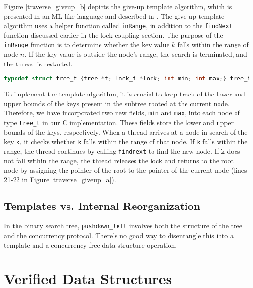 \documentclass[a4paper,UKenglish,cleveref, autoref, thm-restate]{lipics-v2021}
\begin{document}
Figure \ref{traverse_giveup_b} depicts the give-up template algorithm, which is presented in an ML-like language and described in \cite{krishna2019compositional}. The give-up template algorithm uses a helper function called \lstinline{inRange}, in addition to the \lstinline{findNext} function discussed earlier in the lock-coupling section. The purpose of the \lstinline{inRange} function is to determine whether the key value $k$ falls within the range of node $n$. If the key value is outside the node's range, the search is terminated, and the thread is restarted.

\begin{lstlisting}[language = C, backgroundcolor=\color{white}, commentstyle=\color{codegreen}, basicstyle=\ttfamily\footnotesize,
breakatwhitespace=false, breaklines=true, keepspaces=true,                              showspaces=false, showstringspaces=false, showtabs=false, tabsize=1]
	typedef struct tree_t {tree *t; lock_t *lock; int min; int max;} tree_t;
\end{lstlisting}

To implement the template algorithm, it is crucial to keep track of the lower and upper bounds of the keys present in the subtree rooted at the current node. Therefore, we have incorporated two new fields, \lstinline{min} and \lstinline{max}, into each node of type \lstinline{tree_t} in our C implementation. These fields store the lower and upper bounds of the keys, respectively. When a thread arrives at a node in search of the key $\texttt{k}$, it checks whether $\texttt{k}$ falls within the range of that node. If $\texttt{k}$ falls within the range, the thread continues by calling \lstinline{findnext} to find the new node. If $\texttt{k}$ does not fall within the range, the thread releases the lock and returns to the root node by assigning the pointer of the root to the pointer of the current node (lines 21-22 in Figure \ref{traverse_giveup_a}).

\subsection{Templates vs. Internal Reorganization} %
In the binary search tree, \texttt{pushdown\_left} involves both the structure of the tree and the concurrency protocol. There's no good way to disentangle this into a template and a concurrency-free data structure operation.

\section{Verified Data Structures}
\end{document}
